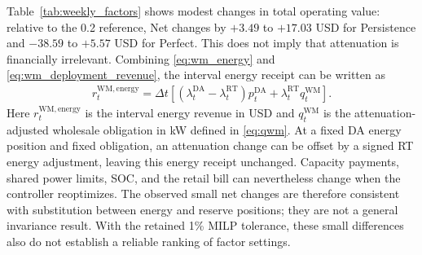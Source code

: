 \documentclass[final,5p,times]{elsarticle}
\newcommand{\dt}{\Delta t}
\newcommand{\DA}{\mathrm{DA}}
\newcommand{\RT}{\mathrm{RT}}
\newcommand{\WM}{\mathrm{WM}}
\begin{document}
Table~\ref{tab:weekly_factors} shows modest changes in total operating value:
relative to the 0.2 reference, Net changes by $+3.49$ to $+17.03$ USD for
Persistence and $-38.59$ to $+5.57$ USD for Perfect. This does not imply
that attenuation is financially irrelevant. Combining
\eqref{eq:wm_energy} and \eqref{eq:wm_deployment_revenue}, the interval
energy receipt can be written as
\begin{align}
r_t^{\WM,\mathrm{energy}}
=\dt\left[(\lambda_t^{\DA}-\lambda_t^{\RT})p_t^{\DA}
+\lambda_t^{\RT}q_t^{\WM}\right].
\label{eq:sensitivity_energy_identity}
\end{align}
Here $r_t^{\WM,\mathrm{energy}}$ is the interval energy revenue in USD and
$q_t^{\WM}$ is the attenuation-adjusted wholesale obligation in kW defined
in \eqref{eq:qwm}. At a fixed DA energy position and fixed obligation, an
attenuation change can be offset by a signed RT energy adjustment, leaving
this energy receipt unchanged. Capacity payments, shared power limits, SOC,
and the retail bill can nevertheless change when the controller reoptimizes.
The observed small net changes are therefore consistent with substitution
between energy and reserve positions; they are not a general invariance
result. With the retained 1\% MILP tolerance, these small differences also
do not establish a reliable ranking of factor settings.
\end{document}
